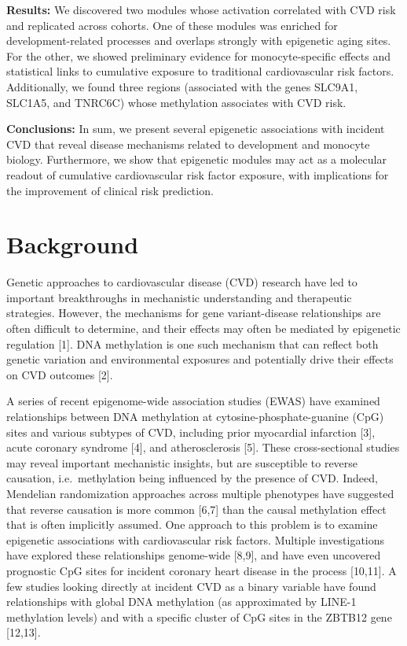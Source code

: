 \documentclass[]{bmcart}
\theoremstyle{definition}
\theoremstyle{definition}
\theoremstyle{definition}
\theoremstyle{remark}
\begin{document}
\textbf{Results:} We discovered two modules whose activation correlated
with CVD risk and replicated across cohorts. One of these modules was
enriched for development-related processes and overlaps strongly with
epigenetic aging sites. For the other, we showed preliminary evidence
for monocyte-specific effects and statistical links to cumulative
exposure to traditional cardiovascular risk factors. Additionally, we
found three regions (associated with the genes SLC9A1, SLC1A5, and
TNRC6C) whose methylation associates with CVD risk.

\textbf{Conclusions:} In sum, we present several epigenetic associations
with incident CVD that reveal disease mechanisms related to development
and monocyte biology. Furthermore, we show that epigenetic modules may
act as a molecular readout of cumulative cardiovascular risk factor
exposure, with implications for the improvement of clinical risk
prediction.

\section{Background}\label{background}

Genetic approaches to cardiovascular disease (CVD) research have led to
important breakthroughs in mechanistic understanding and therapeutic
strategies. However, the mechanisms for gene variant-disease
relationships are often difficult to determine, and their effects may
often be mediated by epigenetic regulation {[}1{]}. DNA methylation is
one such mechanism that can reflect both genetic variation and
environmental exposures and potentially drive their effects on CVD
outcomes {[}2{]}.

A series of recent epigenome-wide association studies (EWAS) have
examined relationships between DNA methylation at
cytosine-phosphate-guanine (CpG) sites and various subtypes of CVD,
including prior myocardial infarction {[}3{]}, acute coronary syndrome
{[}4{]}, and atherosclerosis {[}5{]}. These cross-sectional studies may
reveal important mechanistic insights, but are susceptible to reverse
causation, i.e.~methylation being influenced by the presence of CVD.
Indeed, Mendelian randomization approaches across multiple phenotypes
have suggested that reverse causation is more common {[}6,7{]} than the
causal methylation effect that is often implicitly assumed. One approach
to this problem is to examine epigenetic associations with
cardiovascular risk factors. Multiple investigations have explored these
relationships genome-wide {[}8,9{]}, and have even uncovered prognostic
CpG sites for incident coronary heart disease in the process
{[}10,11{]}. A few studies looking directly at incident CVD as a binary
variable have found relationships with global DNA methylation (as
approximated by LINE-1 methylation levels) and with a specific cluster
of CpG sites in the ZBTB12 gene {[}12,13{]}.
\end{document}
